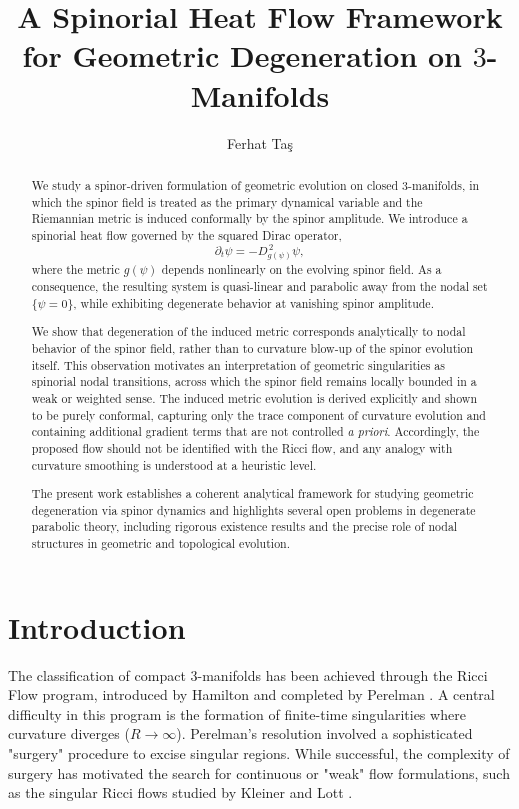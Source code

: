 \documentclass[11pt, reqno, a4paper]{amsart}
\title{A Spinorial Heat Flow Framework for Geometric Degeneration on $3$-Manifolds}
\author{Ferhat Taş}
\theoremstyle{definition}
\theoremstyle{remark}
\begin{document}
\begin{abstract}
We study a spinor-driven formulation of geometric evolution on closed
$3$-manifolds, in which the spinor field is treated as the primary dynamical
variable and the Riemannian metric is induced conformally by the spinor amplitude.
We introduce a spinorial heat flow governed by the squared Dirac operator,
\[
\partial_t \psi = - D_{g(\psi)}^{\,2} \psi ,
\]
where the metric $g(\psi)$ depends nonlinearly on the evolving spinor field.
As a consequence, the resulting system is quasi-linear and parabolic away from
the nodal set $\{\psi=0\}$, while exhibiting degenerate behavior at vanishing
spinor amplitude.

We show that degeneration of the induced metric corresponds analytically to
nodal behavior of the spinor field, rather than to curvature blow-up of the
spinor evolution itself.
This observation motivates an interpretation of geometric singularities as
spinorial nodal transitions, across which the spinor field remains locally
bounded in a weak or weighted sense.
The induced metric evolution is derived explicitly and shown to be purely
conformal, capturing only the trace component of curvature evolution and
containing additional gradient terms that are not controlled \emph{a priori}.
Accordingly, the proposed flow should not be identified with the Ricci flow,
and any analogy with curvature smoothing is understood at a heuristic level.

The present work establishes a coherent analytical framework for studying
geometric degeneration via spinor dynamics and highlights several open
problems in degenerate parabolic theory, including rigorous existence results
and the precise role of nodal structures in geometric and topological evolution.
\end{abstract}


\maketitle

\section{Introduction}

The classification of compact 3-manifolds has been achieved through the Ricci Flow program, introduced by Hamilton \cite{hamilton1982} and completed by Perelman \cite{perelman2002}. A central difficulty in this program is the formation of finite-time singularities where curvature diverges ($R \to \infty$). Perelman's resolution involved a sophisticated "surgery" procedure to excise singular regions. While successful, the complexity of surgery has motivated the search for continuous or "weak" flow formulations, such as the singular Ricci flows studied by Kleiner and Lott \cite{kleiner2014}.
\end{document}

